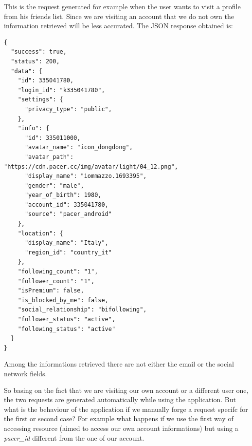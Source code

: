 \begin{enumerate}
				This is the request generated for example when the user wants to visit a profile from his friends list. Since we are visiting an account that we do not own the information retrieved will be less accurated. The JSON response obtained is:
\begin{lstlisting}
{
  "success": true,
  "status": 200,
  "data": {
    "id": 335041780,
    "login_id": "k335041780",
    "settings": {
      "privacy_type": "public",
    },
    "info": {
      "id": 335011000,
      "avatar_name": "icon_dongdong",
      "avatar_path": "https://cdn.pacer.cc/img/avatar/light/04_12.png",
      "display_name": "iommazzo.1693395",
      "gender": "male",
      "year_of_birth": 1980,
      "account_id": 335041780,
      "source": "pacer_android"
    },
    "location": {
      "display_name": "Italy",
      "region_id": "country_it"
    },
    "following_count": "1",
    "follower_count": "1",
    "isPremium": false,
    "is_blocked_by_me": false,
    "social_relationship": "bifollowing",
    "follower_status": "active",
    "following_status": "active"
  }
}
\end{lstlisting}
				Among the informations retrieved there are not either the email or the social network fields.
			\end{enumerate}
			
			\par So basing on the fact that we are visiting our own account or a different user one, the two requests are generated automatically while using the application. But what is the behaviour of the application if we manually forge a request specifc for the first or second case? For example what happens if we use the first way of accessing resource (aimed to access our own account informations) but using a \textit{pacer\_id} different from the one of our account.
		
